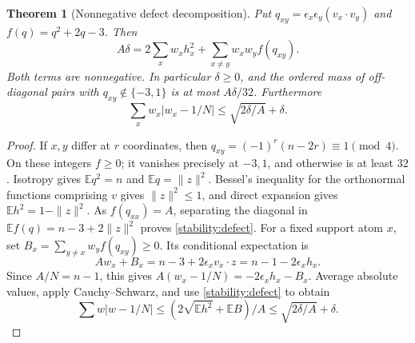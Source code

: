 \documentclass[11pt]{article}
\newtheorem{theorem}{Theorem}[section]
\newcommand{\E}{\mathbb E}
\begin{document}
\begin{theorem}[Nonnegative defect decomposition]
Put $q_{xy}=\epsilon_x\epsilon_y(v_x\cdot v_y)$ and
$f(q)=q^2+2q-3$. Then
\begin{equation}\label{stability:defect}
 A\delta=2\sum_xw_xh_x^2+
 \sum_{x\ne y}w_xw_y f(q_{xy}).
\end{equation}
Both terms are nonnegative. In particular $\delta\ge0$, and the
ordered mass of off-diagonal pairs with $q_{xy}\notin\{-3,1\}$ is
at most $A\delta/32$. Furthermore
\begin{equation}\label{stability:disp}
 \sum_xw_x|w_x-1/N|\le \sqrt{2\delta/A}+\delta.
\end{equation}
\end{theorem}
\begin{proof}
If $x,y$ differ at $r$ coordinates, then
$q_{xy}=(-1)^r(n-2r)\equiv1\pmod4$. On these integers $f\ge0$;
it vanishes precisely at $-3,1$, and otherwise is at least $32$.
Isotropy gives $\E q^2=n$ and $\E q=\|z\|^2$.
Bessel's inequality for the orthonormal functions comprising $v$ gives
$\|z\|^2\le1$, and direct expansion gives
$\E h^2=1-\|z\|^2$. As $f(q_{xx})=A$, separating the diagonal in
$\E f(q)=n-3+2\|z\|^2$ proves \eqref{stability:defect}.
For a fixed support atom $x$, set
$B_x=\sum_{y\ne x}w_yf(q_{xy})\ge0$. Its conditional expectation is
\[
 Aw_x+B_x=n-3+2\epsilon_x v_x\cdot z
 =n-1-2\epsilon_xh_x.
\]
Since $A/N=n-1$, this gives
$A(w_x-1/N)=-2\epsilon_xh_x-B_x$. Average absolute values,
apply Cauchy--Schwarz, and use \eqref{stability:defect} to obtain
\[
 \sum w|w-1/N|\le (2\sqrt{\E h^2}+\E B)/A
 \le\sqrt{2\delta/A}+\delta.
\]
\end{proof}
\end{document}

